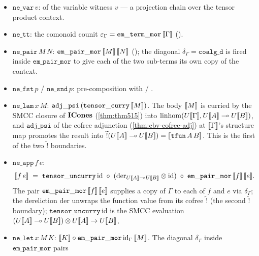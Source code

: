 \begin{itemize}
  \item $\mathtt{ne\_var}\,v$:
     of the variable
    witness $v$ --- a projection chain over the tensor product context.
  \item $\mathtt{ne\_tt}$: the comonoid counit
    $\varepsilon_\Gamma = \mathtt{em\_term\_mor}\,[\![ \Gamma ]\!]$
    ().
  \item $\mathtt{ne\_pair}\,M\,N$:
    $\mathtt{em\_pair\_mor}\,[\![ M ]\!]\,[\![ N ]\!]$
    (); the diagonal
    $\delta_\Gamma = \mathtt{coalg\_d}$ is fired inside
    $\mathtt{em\_pair\_mor}$ to give each of the two sub-terms its own
    copy of the context.
  \item $\mathtt{ne\_fst}\,p$ / $\mathtt{ne\_snd}\,p$: pre-composition
    with  /
    .
  \item $\mathtt{ne\_lam}\,x\,M$:
    $\mathtt{adj\_psi}\,(\mathtt{tensor\_curry}\,[\![ M ]\!])$. The body
    $[\![ M ]\!]$ is curried by the SMCC closure of $\mathbf{ICones}$
    (\autoref{thm:thm515}) into
    $\mathrm{linhom}(U[\![ \Gamma ]\!], U[\![ A ]\!] \multimap U[\![ B ]\!])$, and
    $\mathtt{adj\_psi}$ of the cofree adjunction
    (\autoref{thm:cbv-cofree-adj}) at $[\![ \Gamma ]\!]$'s structure map
    promotes the result into
    $\widetilde{\mathord{!}}(U[\![ A ]\!] \multimap U[\![ B ]\!]) =
    [\![ \mathtt{tfun}\,A\,B ]\!]$. This is the first of the two
    $\widetilde{\mathord{!}}$ boundaries.
  \item $\mathtt{ne\_app}\,f\,e$:
    \[
      \sem{f \, e}
      \;=\;
      \mathtt{tensor\_uncurry}\,\mathrm{id}
        \;\circ\;
        (\mathrm{der}_{U\sem{A} \multimap U\sem{B}} \otimes \mathrm{id})
        \;\circ\;
        \mathtt{em\_pair\_mor}\,\sem{f}\,\sem{e}.
    \]
    The pair $\mathtt{em\_pair\_mor}\,[\![ f ]\!]\,[\![ e ]\!]$ supplies a copy
    of $\Gamma$ to each of $f$ and $e$ via $\delta_\Gamma$; the
    dereliction $\mathrm{der}$ unwraps the function value from its
    cofree $\widetilde{\mathord{!}}$ (the second $\widetilde{\mathord{!}}$
    boundary); $\mathtt{tensor\_uncurry}\,\mathrm{id}$ is the SMCC
    evaluation $(U\sem{A} \multimap U\sem{B}) \otimes U\sem{A} \to
    U\sem{B}$.
  \item $\mathtt{ne\_let}\,x\,M\,K$:
    $[\![ K ]\!] \circ \mathtt{em\_pair\_mor}\,\mathrm{id}_\Gamma\,[\![ M ]\!]$.
    The diagonal $\delta_\Gamma$ inside $\mathtt{em\_pair\_mor}$ pairs

\end{itemize}
